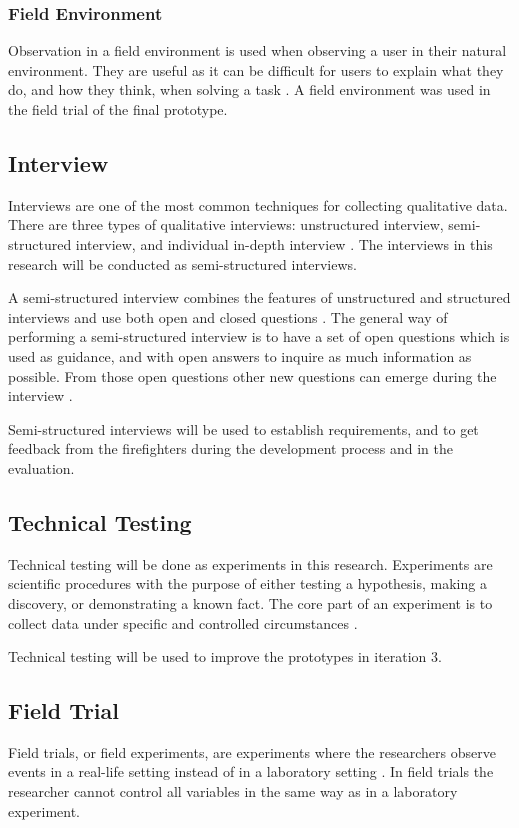 \documentclass[../Main/thesis.tex]{subfiles}
\begin{document}
\subsubsection{Field Environment}
Observation in a field environment is used when observing a user in their natural environment.
They are useful as it can be difficult for users to explain what they do, and how they think, when solving a task \citep{Preece2011}.
A field environment was used in the field trial of the final prototype.

\subsection{Interview}
Interviews are one of the most common techniques for collecting qualitative data.
There are three types of qualitative interviews: unstructured interview, semi-structured interview, and individual in-depth interview \citep{DiCicco-Bloom2006}.
The interviews in this research will be conducted as semi-structured interviews.

A semi-structured interview combines the features of unstructured and structured interviews and use both open and closed questions \citep{Preece2011}.
The general way of performing a semi-structured interview is to have a set of open questions which is used as guidance, and with open answers to inquire as much information as possible.
From those open questions other new questions can emerge during the interview \citep{DiCicco-Bloom2006}.

Semi-structured interviews will be used to establish requirements, and to get feedback from the firefighters during the development process and in the evaluation. 

\subsection{Technical Testing}
Technical testing will be done as experiments in this research.
Experiments are scientific procedures with the purpose of either testing a hypothesis, making a discovery, or demonstrating a known fact.
The core part of an experiment is to collect data under specific and controlled circumstances \citep{Hellevik2002}.

Technical testing will be used to improve the prototypes in iteration 3.

\subsection{Field Trial}
Field trials, or field experiments, are experiments where the researchers observe events in a real-life setting instead of in a laboratory setting \citep{oates2005researching}.
In field trials the researcher cannot control all variables in the same way as in a laboratory experiment.
\end{document}
